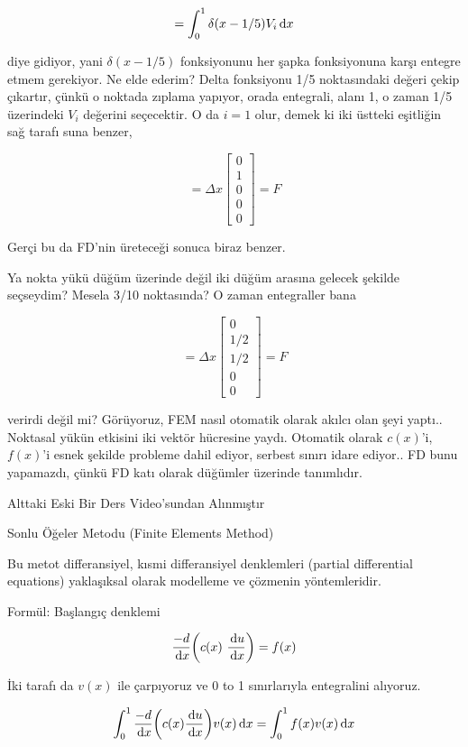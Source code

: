 \documentclass[12pt,fleqn]{article}\usepackage{../../common}
\begin{document}
$$
= \int_{0}^{1} \delta (x-1/5) V_i \,\mathrm{d} x
$$

diye gidiyor, yani $\delta (x-1/5)$ fonksiyonunu her şapka fonksiyonuna karşı
entegre etmem gerekiyor. Ne elde ederim? Delta fonksiyonu 1/5 noktasındaki
değeri çekip çıkartır, çünkü o noktada zıplama yapıyor, orada entegrali, alanı
1, o zaman 1/5 üzerindeki $V_i$ değerini seçecektir. O da $i=1$ olur, demek ki
iki üstteki eşitliğin sağ tarafı suna benzer,

$$
= \Delta x
\left[\begin{array}{r}
0 \\ 1 \\ 0 \\ 0 \\ 0
\end{array}\right] = F
$$

Gerçi bu da FD'nin üreteceği sonuca biraz benzer.

Ya nokta yükü düğüm üzerinde değil iki düğüm arasına gelecek şekilde seçseydim?
Mesela 3/10 noktasında? O zaman entegraller bana

$$
= \Delta x
\left[\begin{array}{r}
0 \\ 1/2 \\ 1/2 \\ 0 \\ 0
\end{array}\right] = F
$$

verirdi değil mi? Görüyoruz, FEM nasıl otomatik olarak akılcı olan şeyi yaptı..
Noktasal yükün etkisini iki vektör hücresine yaydı. Otomatik olarak $c(x)$'i,
$f(x)$'i esnek şekilde probleme dahil ediyor, serbest sınırı idare ediyor..  FD
bunu yapamazdı, çünkü FD katı olarak düğümler üzerinde tanımlıdır.

\newpage

Alttaki Eski Bir Ders Video'sundan Alınmıştır

Sonlu Öğeler Metodu (Finite Elements Method)

Bu metot differansiyel, kısmi differansiyel denklemleri (partial differential
equations) yaklaşıksal olarak modelleme ve çözmenin yöntemleridir.

Formül: Başlangıç denklemi

$$ \frac{-d}{\,\mathrm{d} x} \bigg( c(x) \ \frac{\,\mathrm{d} u}{\,\mathrm{d} x} \bigg) = f(x) $$

İki tarafı da  $v(x)$ ile çarpıyoruz ve 0 to 1 sınırlarıyla entegralini alıyoruz.

$$
\int_0^1 \frac{-d}{\,\mathrm{d} x} \bigg( c(x) \frac{\,\mathrm{d} u}{\,\mathrm{d} x} \bigg) v(x)\,\mathrm{d} x
= \int_0^1 f(x)v(x) \,\mathrm{d} x
$$
\end{document}
